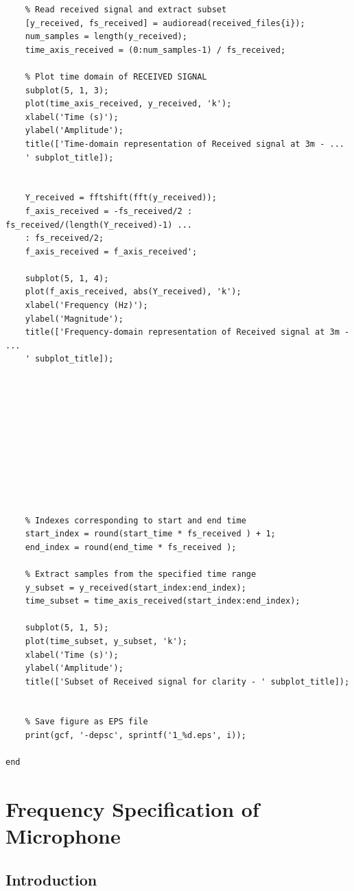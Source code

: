 \documentclass{report}
\begin{document}
\begin{lstlisting}
    % Read received signal and extract subset
    [y_received, fs_received] = audioread(received_files{i});
    num_samples = length(y_received);
    time_axis_received = (0:num_samples-1) / fs_received;
  
    % Plot time domain of RECEIVED SIGNAL
    subplot(5, 1, 3);
    plot(time_axis_received, y_received, 'k');
    xlabel('Time (s)');
    ylabel('Amplitude');
    title(['Time-domain representation of Received signal at 3m - ...
    ' subplot_title]);


    Y_received = fftshift(fft(y_received));
    f_axis_received = -fs_received/2 : fs_received/(length(Y_received)-1) ...
    : fs_received/2;
    f_axis_received = f_axis_received';

    subplot(5, 1, 4);
    plot(f_axis_received, abs(Y_received), 'k');
    xlabel('Frequency (Hz)');
    ylabel('Magnitude');
    title(['Frequency-domain representation of Received signal at 3m - ...
    ' subplot_title]);











    % Indexes corresponding to start and end time
    start_index = round(start_time * fs_received ) + 1;
    end_index = round(end_time * fs_received );

    % Extract samples from the specified time range
    y_subset = y_received(start_index:end_index);
    time_subset = time_axis_received(start_index:end_index);   

    subplot(5, 1, 5);
    plot(time_subset, y_subset, 'k');
    xlabel('Time (s)');
    ylabel('Amplitude');
    title(['Subset of Received signal for clarity - ' subplot_title]);
    

    % Save figure as EPS file
    print(gcf, '-depsc', sprintf('1_%d.eps', i));

end

\end{lstlisting}



\chapter{ Frequency Specification of Microphone }

\section{Introduction}
\end{document}
